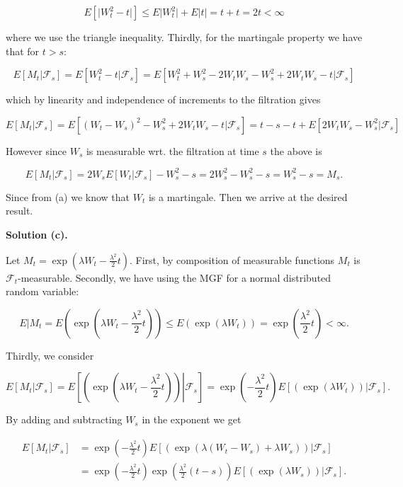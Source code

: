 \documentclass[
]{article}
\begin{document}
\[E[\vert W_t^2-t\vert]\le E\vert W_t^2\vert +E\vert t\vert=t+t=2t<\infty\]

where we use the triangle inequality. Thirdly, for the martingale
property we have that for \(t>s\):

\[E[M_t\vert \mathcal{F}_s]=E[W_t^2-t\vert \mathcal{F}_s]=E[W_t^2+W_s^2-2W_tW_s-W_s^2+2W_tW_s-t\vert \mathcal{F}_s]\]

which by linearity and independence of increments to the filtration
gives

\[E[M_t\vert \mathcal{F}_s]=E[(W_t-W_s)^2-W_s^2+2W_tW_s-t\vert \mathcal{F}_s]=t-s-t+E[2W_tW_s-W_s^2\vert \mathcal{F}_s]\]

However since \(W_s\) is measurable wrt. the filtration at time \(s\)
the above is

\[E[M_t\vert \mathcal{F}_s]=2W_sE[W_t\vert \mathcal{F}_s]-W_s^2-s=2W_s^2-W_s^2-s=W_s^2-s=M_s.\]

Since from (a) we know that \(W_t\) is a martingale. Then we arrive at
the desired result.

\textbf{Solution (c).}

Let \(M_t=\exp\left(\lambda W_t-\frac{\lambda^2}{2}t\right)\). First, by
composition of measurable functions \(M_t\) is
\(\mathcal{F}_t\)-measurable. Secondly, we have using the MGF for a
normal distributed random variable:

\[E\vert M_t=E\left(\exp\left(\lambda W_t-\frac{\lambda^2}{2}t\right)\right)\le E\left(\exp\left(\lambda W_t\right)\right)=\exp\left(\frac{\lambda^2}{2}t\right)<\infty.\]

Thirdly, we consider

\[E[M_t\vert\mathcal{F}_s]=E\left.\left[\left(\exp\left(\lambda W_t-\frac{\lambda^2}{2}t\right)\right)\right\vert\mathcal{F}_s\right]=\exp\left(-\frac{\lambda^2}{2}t\right)E\left.\left[\left(\exp\left(\lambda W_t\right)\right)\right\vert\mathcal{F}_s\right].\]

By adding and subtracting \(W_s\) in the exponent we get

\begin{align*}
E[M_t\vert\mathcal{F}_s]&=\exp\left(-\frac{\lambda^2}{2}t\right)E\left.\left[\left(\exp\left(\lambda (W_t-W_s)+\lambda W_s\right)\right)\right\vert\mathcal{F}_s\right]\\
&=\exp\left(-\frac{\lambda^2}{2}t\right)\exp\left(\frac{\lambda^2}{2}(t-s)\right)E\left.\left[\left(\exp\left(\lambda W_s\right)\right)\right\vert\mathcal{F}_s\right].
\end{align*}
\end{document}
